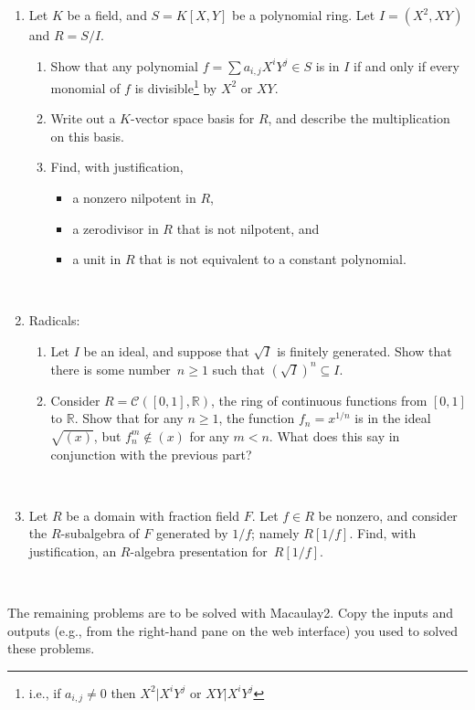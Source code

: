 \documentclass[12pt]{amsart}
\newcommand{\R}{\mathbb{R}}
\begin{document}
	
\begin{enumerate}
\item Let $K$ be a field, and $S=K[X,Y]$ be a polynomial ring. Let $I=(X^2,XY)$ and $R=S/I$.
\begin{enumerate}
\item Show that any polynomial $f=\sum a_{i,j} X^i Y^j \in S$ is in $I$ if and only if every monomial of $f$ is divisible\footnote{i.e., if $a_{i,j}\neq 0$ then $X^2 | X^i Y^j$ or $XY | X^i Y^j$} by $X^2$ or $XY$.
\item Write out a $K$-vector space basis for $R$, and describe the multiplication on this basis.
\item Find, with justification,
\begin{itemize}
\item a nonzero nilpotent in $R$,
\item a zerodivisor in $R$ that is not nilpotent, and
\item a unit in $R$ that is not equivalent to a constant polynomial.
\end{itemize}
\end{enumerate}


\


\item Radicals:
\begin{enumerate}
\item Let $I$ be an ideal, and suppose that $\sqrt{I}$ is finitely generated. Show that there is some number~$n\geq 1$ such that $(\sqrt{I})^n \subseteq I$.
\item Consider $R=\mathcal{C}([0,1],\R)$, the ring of continuous functions from $[0,1]$ to $\R$. Show that for any $n\geq 1$, the function $f_n = x^{1/n}$ is in the ideal $\sqrt{(x)}$, but $f_n^m \notin (x)$ for any $m<n$. What does this say in conjunction with the previous part?
\end{enumerate}

\


\item Let $R$ be a domain with fraction field $F$. Let $f\in R$ be nonzero, and consider the $R$-subalgebra of $F$ generated by $1/f$; namely $R[1/f]$. Find, with justification, an $R$-algebra presentation for~$R[1/f]$.


\end{enumerate}

\


The remaining problems are to be solved with Macaulay2. Copy the inputs and outputs (e.g., from the right-hand pane on the web interface) you used to solved these problems.
\end{document}
